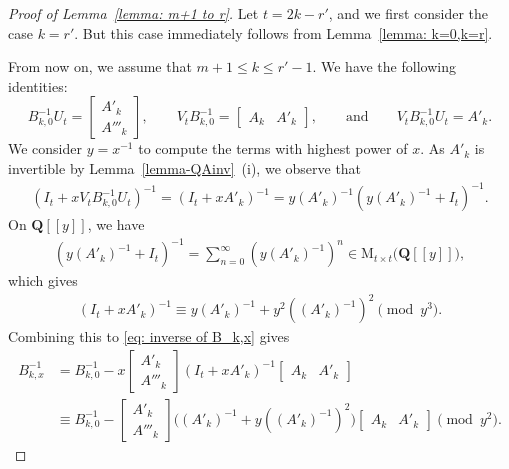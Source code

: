 \documentclass[10pt,a4paper]{amsart}
\newcommand{\M}{\mathrm{M}}
\newcommand{\Q}{\mathbf{Q}}
\begin{document}
\begin{proof}[Proof of Lemma~\ref{lemma: m+1 to r}]
Let $t=2k-r'$, and we first consider the case $k=r'$. But this case immediately follows from Lemma~\ref{lemma: k=0,k=r}.




From now on, we assume that $m+1\leq k\leq r'-1$. We have the following identities:
$$B_{k,0}^{-1}U_t
=
        \begin{bmatrix}
          A'_k \\
          A'''_k
        \end{bmatrix},
\qquad
    V_tB_{k,0}^{-1}
        =
        \begin{bmatrix}
          A_k & A'_k
        \end{bmatrix},
\qquad\mbox{and}\qquad
    V_tB_{k,0}^{-1}U_t
        =A'_k.$$
We consider $y=x^{-1}$ to compute the terms with highest power of $x$. As $A'_k$ is invertible by Lemma~\ref{lemma-QAinv}~(i), we observe that
    \begin{align*}
        (I_t+xV_tB_{k,0}^{-1}U_t)^{-1}
        =
        (I_t+xA'_k)^{-1}
        =y(A'_k)^{-1}(y(A'_k)^{-1}+I_t)^{-1}.
    \end{align*}
    On $\Q[[y]]$, we have
    \begin{align*}
        (y(A'_k)^{-1}+I_t)^{-1}
        =\sum_{n=0}^\infty (y(A'_k)^{-1})^n
        \in \M_{t\times t}\big( \Q[[y]] \big),
    \end{align*}
    which gives
    \begin{align*}
        (I_t+xA'_k)^{-1}
        \equiv
        y(A'_k)^{-1}+y^2((A'_k)^{-1})^2 \pmod{y^3}.
    \end{align*}
Combining this to \eqref{eq: inverse of B_k,x} gives
    \begin{align*}
        B_{k,x}^{-1}
        &=
        B_{k,0}^{-1}
        -x
        \begin{bmatrix}
            A'_k \\
            A'''_k
        \end{bmatrix}
        (I_t+xA'_k)^{-1}
        \begin{bmatrix}
            A_k & A'_k
        \end{bmatrix}
        \\
        &\equiv
        B_{k,0}^{-1}
        -
        \begin{bmatrix}
            A'_k \\
            A'''_k
        \end{bmatrix}
        \big((A'_k)^{-1}+y((A'_k)^{-1})^2\big)
        \begin{bmatrix}
            A_k & A'_k
        \end{bmatrix}
        \pmod{y^2}.
    \end{align*}


\end{proof}
\end{document}
